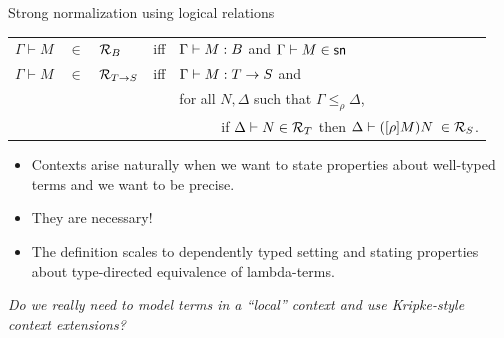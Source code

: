 \documentclass{beamer}
\begin{document}
\begin{frame}{Strong normalization using logical relations}



\pause
\begin{definition}
\mbox{}
\begin{tabular}{l@{~}c@{~}lll}
  $\Gamma \vdash M$ & $\in$ & $\mathcal{R}_B$ & iff & $\Gamma\vdash M\mathrel{:} B$
                                          and $\Gamma \vdash M \in \mathsf{sn}$\\
  $\Gamma \vdash M$ & $\in$ & $\mathcal{R}_{T\rightarrow S}$ & iff &
$ \Gamma\vdash M\mathrel{:} {T\rightarrow S}$ and  \\
  & & & & for all $N,\Delta$ such that
  $\Gamma \leq_\rho \Delta$,  \\
  & & & & ~~~~~~if $\Delta \vdash N\in \mathcal{R}_{T} $ then
  $\Delta \vdash ([\rho]M) N\;\in \mathcal{R}_{S} $.

\end{tabular}
\end{definition}
\vspace{1ex}
\begin{itemize}
\item Contexts arise naturally when we want to state properties about
  well-typed terms and we want to be precise.
\item They are necessary! 
\item The definition scales to dependently typed setting and stating
  properties about type-directed equivalence of lambda-terms.
\end{itemize}
\pause
\vspace{1ex}
{\centering \textit {Do we really need to model terms in a ``local'' context and
  use Kripke-style context extensions?}}
\pause

\end{frame}
\end{document}
